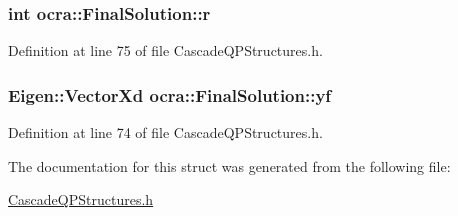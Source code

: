 \subsubsection[{\texorpdfstring{r}{r}}]{\setlength{\rightskip}{0pt plus 5cm}int ocra\+::\+Final\+Solution\+::r}\hypertarget{structocra_1_1FinalSolution_a5d1585ffcc8f9352521c2607a4c119a3}{}\label{structocra_1_1FinalSolution_a5d1585ffcc8f9352521c2607a4c119a3}


Definition at line 75 of file Cascade\+Q\+P\+Structures.\+h.

\subsubsection[{\texorpdfstring{yf}{yf}}]{\setlength{\rightskip}{0pt plus 5cm}Eigen\+::\+Vector\+Xd ocra\+::\+Final\+Solution\+::yf}\hypertarget{structocra_1_1FinalSolution_a10e9bf5b4c17125d9f3b8b807c627347}{}\label{structocra_1_1FinalSolution_a10e9bf5b4c17125d9f3b8b807c627347}


Definition at line 74 of file Cascade\+Q\+P\+Structures.\+h.



The documentation for this struct was generated from the following file\+:\begin{DoxyCompactItemize}
\item 
\hyperlink{CascadeQPStructures_8h}{Cascade\+Q\+P\+Structures.\+h}\end{DoxyCompactItemize}
